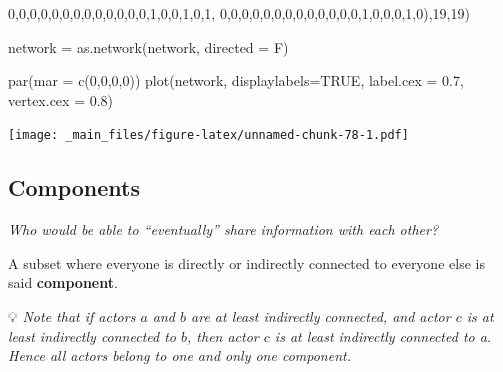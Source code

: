 \documentclass[
  notitlepage,
  onecolumn,
  openany]{book}
\newenvironment{Shaded}{\begin{snugshade}}{\end{snugshade}}
\newcommand{\AttributeTok}[1]{\textcolor[rgb]{0.77,0.63,0.00}{#1}}
\newcommand{\ConstantTok}[1]{\textcolor[rgb]{0.00,0.00,0.00}{#1}}
\newcommand{\DecValTok}[1]{\textcolor[rgb]{0.00,0.00,0.81}{#1}}
\newcommand{\FloatTok}[1]{\textcolor[rgb]{0.00,0.00,0.81}{#1}}
\newcommand{\FunctionTok}[1]{\textcolor[rgb]{0.00,0.00,0.00}{#1}}
\newcommand{\NormalTok}[1]{#1}
\newcommand{\OtherTok}[1]{\textcolor[rgb]{0.56,0.35,0.01}{#1}}
\begin{document}
\begin{Shaded}
\begin{Highlighting}[]
\DecValTok{0}\NormalTok{,}\DecValTok{0}\NormalTok{,}\DecValTok{0}\NormalTok{,}\DecValTok{0}\NormalTok{,}\DecValTok{0}\NormalTok{,}\DecValTok{0}\NormalTok{,}\DecValTok{0}\NormalTok{,}\DecValTok{0}\NormalTok{,}\DecValTok{0}\NormalTok{,}\DecValTok{0}\NormalTok{,}\DecValTok{0}\NormalTok{,}\DecValTok{0}\NormalTok{,}\DecValTok{0}\NormalTok{,}\DecValTok{1}\NormalTok{,}\DecValTok{0}\NormalTok{,}\DecValTok{0}\NormalTok{,}\DecValTok{1}\NormalTok{,}\DecValTok{0}\NormalTok{,}\DecValTok{1}\NormalTok{,}
\DecValTok{0}\NormalTok{,}\DecValTok{0}\NormalTok{,}\DecValTok{0}\NormalTok{,}\DecValTok{0}\NormalTok{,}\DecValTok{0}\NormalTok{,}\DecValTok{0}\NormalTok{,}\DecValTok{0}\NormalTok{,}\DecValTok{0}\NormalTok{,}\DecValTok{0}\NormalTok{,}\DecValTok{0}\NormalTok{,}\DecValTok{0}\NormalTok{,}\DecValTok{0}\NormalTok{,}\DecValTok{0}\NormalTok{,}\DecValTok{1}\NormalTok{,}\DecValTok{0}\NormalTok{,}\DecValTok{0}\NormalTok{,}\DecValTok{0}\NormalTok{,}\DecValTok{1}\NormalTok{,}\DecValTok{0}\NormalTok{),}\DecValTok{19}\NormalTok{,}\DecValTok{19}\NormalTok{)}

\NormalTok{network }\OtherTok{=} \FunctionTok{as.network}\NormalTok{(network, }\AttributeTok{directed =}\NormalTok{ F)}

\FunctionTok{par}\NormalTok{(}\AttributeTok{mar =} \FunctionTok{c}\NormalTok{(}\DecValTok{0}\NormalTok{,}\DecValTok{0}\NormalTok{,}\DecValTok{0}\NormalTok{,}\DecValTok{0}\NormalTok{))}
\FunctionTok{plot}\NormalTok{(network,}
     \AttributeTok{displaylabels=}\ConstantTok{TRUE}\NormalTok{,}
     \AttributeTok{label.cex =} \FloatTok{0.7}\NormalTok{,}
     \AttributeTok{vertex.cex =} \FloatTok{0.8}\NormalTok{)}
\end{Highlighting}
\end{Shaded}

\texttt{[image: \_main\_files/figure-latex/unnamed-chunk-78-1.pdf]}

\hypertarget{components-1}{%
\subsection{Components}\label{components-1}}

\emph{Who would be able to ``eventually'' share information with each other?}

A subset where everyone is directly or indirectly connected to everyone else is said \textbf{component}.

💡 \emph{Note that if actors \(a\) and \(b\) are at least indirectly connected, and actor \(c\) is at least indirectly connected to \(b\), then actor \(c\) is at least indirectly connected to a. Hence all actors belong to one and only one component.}
\end{document}
